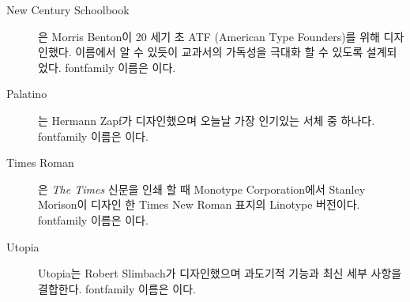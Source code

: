 \begin{description}
\item[New Century Schoolbook] {은 Morris Benton이 20 세기 초 ATF (American Type Founders)를 위해 디자인했다. 이름에서 알 수 있듯이 교과서의 가독성을 극대화 할 수 있도록 설계되었다. fontfamily 이름은 이다.

\vspace{0.5\onelineskip}
\fox\par\Kafka\par\namesAZ
\vspace{0.5\onelineskip}
}


\item[Palatino] { 는 Hermann Zapf가 디자인했으며 오늘날 가장 인기있는 서체 중 하나다. fontfamily 이름은 이다.

\vspace{0.5\onelineskip}
\fox\par\Kafka\par\namesAZ
\vspace{0.5\onelineskip}
}


\item[Times Roman] { 은 \emph{The Times} 신문을 인쇄 할 때 Monotype Corporation에서 Stanley Morison이 디자인 한 Times New Roman 표지의 Linotype 버전이다. 
fontfamily 이름은 이다.

\vspace{0.5\onelineskip}
\fox\par\Kafka\par\namesAZ
\vspace{0.5\onelineskip}
}

\item[Utopia]
{Utopia는 Robert Slimbach가 디자인했으며 과도기적 기능과 최신 세부 사항을 결합한다. fontfamily 이름은 이다.

}
\end{description}
